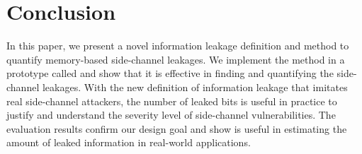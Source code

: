 \section{Conclusion}
In this paper, we present a novel information leakage definition and method to
quantify memory-based side-channel leakages. We implement the method in
a prototype called \tool{} and show that it is effective in finding
and quantifying the side-channel leakages. With the new definition of
information leakage that imitates real side-channel attackers, the number of
leaked bits is useful in practice to justify and understand the severity level
of side-channel vulnerabilities. The evaluation results confirm our design goal
and show \tool{} is useful in estimating the amount of leaked information in
real-world applications.
